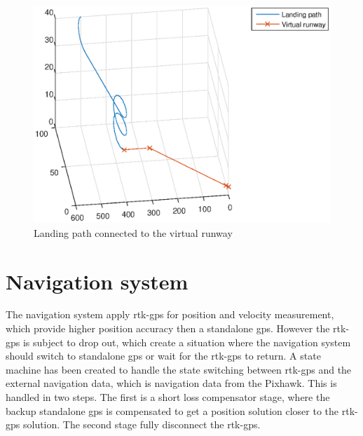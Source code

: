\begin{figure}[H]
	\centering
		\includegraphics[width=1\textwidth]{figs/SysPlot/LandingPath.eps}
		\caption{Landing path connected to the virtual runway}
		\label{Fig:LandingPath}
\end{figure}

\section{Navigation system}
The navigation system apply \gls{rtk-gps} for position and velocity measurement, which provide higher position accuracy then a standalone \gls{gps}. However the \gls{rtk-gps} is subject to drop out, which create a situation where the navigation system should switch to standalone \gls{gps} or wait for the \gls{rtk-gps} to return. A state machine has been created to handle the state switching between \gls{rtk-gps} and the external navigation data, which is navigation data from the Pixhawk. This is handled in two steps. The first is a short loss compensator stage, where the backup standalone \gls{gps} is compensated to get a position solution closer to the \gls{rtk-gps} solution. The second stage fully disconnect the \gls{rtk-gps}.

